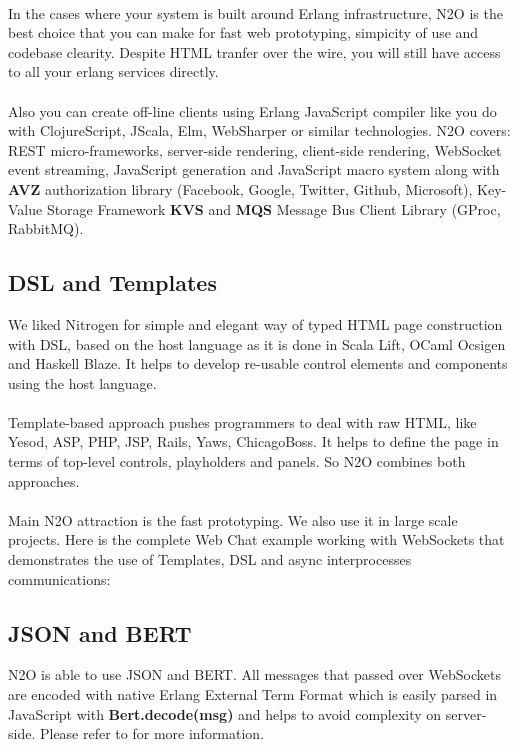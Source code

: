 \paragraph{}
In the cases where your system is built around Erlang infrastructure, N2O
is the best choice that you can make for fast web prototyping, simpicity
of use and codebase clearity. Despite HTML tranfer over the wire,
you will still have access to all your erlang services directly.
\paragraph{}
Also you can create off-line clients using Erlang JavaScript compiler like you do with
ClojureScript, JScala, Elm, WebSharper or similar technologies. N2O covers: REST micro-frameworks,
server-side rendering, client-side rendering, WebSocket event streaming, JavaScript generation
and JavaScript macro system along with {\bf AVZ} authorization library (Facebook, Google, Twitter, Github, Microsoft),
Key-Value Storage Framework {\bf KVS} and {\bf MQS} Message Bus Client Library (GProc, RabbitMQ).

\subsection*{DSL and Templates}
We liked Nitrogen for simple and elegant way of typed HTML page
construction with DSL, based on the host language as it is done in Scala Lift,
OCaml Ocsigen and Haskell Blaze. It helps to develop re-usable control
elements and components using the host language.
\paragraph{}
Template-based approach pushes programmers to deal with raw HTML,
like Yesod, ASP, PHP, JSP, Rails, Yaws, ChicagoBoss. It helps to
define the page in terms of top-level controls, playholders
and panels. So N2O combines both approaches.
\paragraph{}
Main N2O attraction is the fast prototyping. We also use it in large
scale projects. Here is the complete Web Chat example working with
WebSockets that demonstrates the use of Templates, DSL and async
interprocesses communications:

\subsection*{JSON and BERT}
N2O is able to use JSON and BERT. All messages that passed over WebSockets are encoded with
native Erlang External Term Format which is easily parsed in JavaScript
with {\bf Bert.decode(msg)} and helps to avoid complexity on server-side.
Please refer to  for more information.

